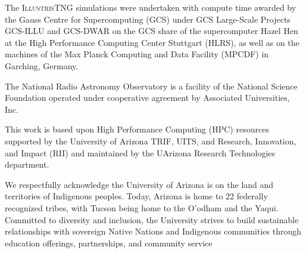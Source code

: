 \documentclass[twocolumn]{aastex631}
\begin{document}
The \textsc{IllustrisTNG} simulations were undertaken with compute time awarded by the Gauss Centre for Supercomputing (GCS) under GCS Large-Scale Projects GCS-ILLU and GCS-DWAR on the GCS share of the supercomputer Hazel Hen at the High Performance Computing Center Stuttgart (HLRS), as well as on the machines of the Max Planck Computing and Data Facility (MPCDF) in Garching, Germany.

The National Radio Astronomy Observatory is a facility of the National Science Foundation operated under cooperative agreement by Associated Universities, Inc.

This work is based upon High Performance Computing (HPC) resources supported by the University of Arizona TRIF, UITS, and Research, Innovation, and Impact (RII) and maintained by the UArizona Research Technologies department.

We respectfully acknowledge the University of Arizona is on the land and territories of Indigenous peoples. Today, Arizona is home to 22 federally recognized tribes, with Tucson being home to the O’odham and the Yaqui. Committed to diversity and inclusion, the University strives to build sustainable relationships with sovereign Native Nations and Indigenous communities through education offerings, partnerships, and community service


{}

\end{document}

